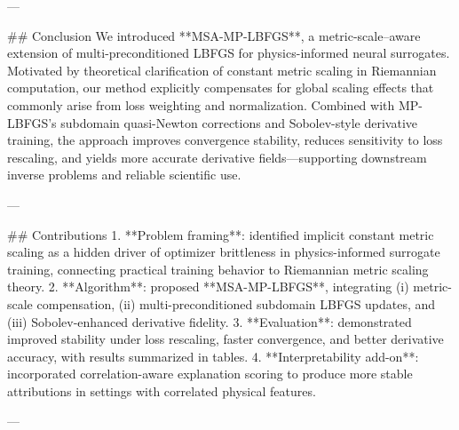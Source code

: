 ---

## Conclusion  
We introduced **MSA-MP-LBFGS**, a metric-scale–aware extension of multi-preconditioned LBFGS for physics-informed neural surrogates. Motivated by theoretical clarification of constant metric scaling in Riemannian computation, our method explicitly compensates for global scaling effects that commonly arise from loss weighting and normalization. Combined with MP-LBFGS’s subdomain quasi-Newton corrections and Sobolev-style derivative training, the approach improves convergence stability, reduces sensitivity to loss rescaling, and yields more accurate derivative fields—supporting downstream inverse problems and reliable scientific use.

---

## Contributions  
1. **Problem framing**: identified implicit constant metric scaling as a hidden driver of optimizer brittleness in physics-informed surrogate training, connecting practical training behavior to Riemannian metric scaling theory.  
2. **Algorithm**: proposed **MSA-MP-LBFGS**, integrating (i) metric-scale compensation, (ii) multi-preconditioned subdomain LBFGS updates, and (iii) Sobolev-enhanced derivative fidelity.  
3. **Evaluation**: demonstrated improved stability under loss rescaling, faster convergence, and better derivative accuracy, with results summarized in tables.  
4. **Interpretability add-on**: incorporated correlation-aware explanation scoring to produce more stable attributions in settings with correlated physical features.

---